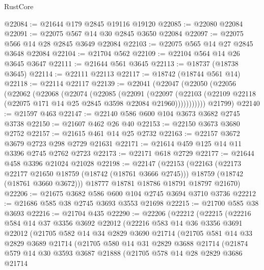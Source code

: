 \begin{lexlean}{RustCore}
\begin{coremodule}
@22084 := @21644 @179 @2845 @19116 @19120
@22085 := @22080 @22084
@22091 := @22075 @567 @14 @30 @2845 @3650 @22084
@22097 := @22075 @566 @14 @28 @2845 @3649 @22084
@22103 := @22075 @565 @14 @27 @2845 @3648 @22084
@22104 := @21704 @562
@22109 := @22104 @564 @14 @26 @3645 @3647
@22111 := @21644 @561 @3645
@22113 := @18737 (@18738 @3645)
@22114 := @22111 @22113
@22117 := @18742 (@18744 @561 @14)
@22118 := @22114 @22117
@22139 := @22041
    (@22047
      (@22050
        (@22056
          (@22062
            (@22068
              (@22074
                (@22085
                  (@22091
                    (@22097
                      (@22103
                        (@22109 @22118 (@22075 @171 @14 @25 @2845 @3598 @22084 @21960)))))))))))
      @21799)
@22140 := @21597 @463
@22147 := @22140 @586 @600 @104 @3673 @3682 @2745 @3738
@22150 := @21607 @462 @26 @40
@22153 := @22150 @3673 @3680 @2752
@22157 := @21615 @461 @14 @25 @2732
@22163 := @22157 @3672 @3679 @2723 @298 @2729 @21631
@22171 := @21614 @459 @125 @14 @11 @3396 @2745 @2762 @2723
@22173 := @22171 @618 @2729
@22177 := @21644 @458 @3396 @21024 @21028
@22198 := @22147
    (@22153
      (@22163
        (@22173 @22177 @21650 @18759 (@18742 (@18761 @3666 @2745)))
        @18759
        (@18742 (@18761 @3660 @3672)))
      @18777
      @18781
      @18786
      @18791
      @18797
      @21670)
@22206 := @21675 @3682 @586 @600 @104 @2745 @3694 @3710 @3736
@22212 := @21686 @585 @38 @2745 @3693 @3553 @21698
@22215 := @21700 @585 @38 @3693
@22216 := @21704 @435
@22290 := @22206
    (@22212
      (@22215
        (@22216
          @584
          @14
          @37
          @3356
          @3692
          @22012
          (@22216
            @583
            @14
            @36
            @3356
            @3691
            @22012
            (@21705
              @582
              @14
              @34
              @2829
              @3690
              @21714
              (@21705
                @581
                @14
                @33
                @2829
                @3689
                @21714
                (@21705
                  @580
                  @14
                  @31
                  @2829
                  @3688
                  @21714
                  (@21874
                    @579
                    @14
                    @30
                    @3593
                    @3687
                    @21888
                    (@21705
                      @578
                      @14
                      @28
                      @2829
                      @3686
                      @21714

\end{coremodule}
\end{lexlean}
